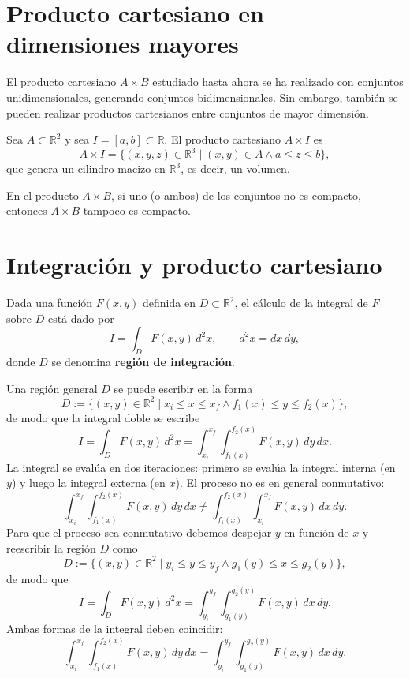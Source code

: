 \section{Producto cartesiano en dimensiones mayores}

El producto cartesiano $A\times B$ estudiado hasta ahora se ha realizado con
conjuntos unidimensionales, generando conjuntos bidimensionales. Sin
embargo, también se pueden realizar productos cartesianos entre conjuntos de
mayor dimensión.

\begin{ejemplo}
Sea $A \subset \mathbb{R}^2$ y sea $I=[a,b]\subset\mathbb{R}$. El producto
cartesiano $A \times I$ es
\[
A \times I = \{(x,y,z)\in\mathbb{R}^3 \mid (x,y)\in A \wedge a\le z\le b\},
\]
que genera un cilindro macizo en $\mathbb{R}^3$, es decir, un volumen.
\end{ejemplo}

\begin{observacion}
En el producto $A \times B$, si uno (o ambos) de los conjuntos no es
compacto, entonces $A\times B$ tampoco es compacto.
\end{observacion}

\section{Integración y producto cartesiano}

Dada una función $F(x,y)$ definida en $D \subset \mathbb{R}^2$, el cálculo de
la integral de $F$ sobre $D$ está dado por
\[
I = \int_D F(x,y)\, d^2x, \qquad d^2x = dx\,dy,
\]
donde $D$ se denomina \textbf{región de integración}.

Una región general $D$ se puede escribir en la forma
\[
D := \{(x,y)\in\mathbb{R}^2 \mid x_i \le x \le x_f \wedge f_1(x) \le y \le
f_2(x)\},
\]
de modo que la integral doble se escribe
\[
I = \int_D F(x,y)\, d^2x = \int_{x_i}^{x_f} \int_{f_1(x)}^{f_2(x)}
F(x,y)\, dy\, dx .
\]
La integral se evalúa en dos iteraciones: primero se evalúa la integral
interna (en $y$) y luego la integral externa (en $x$). El proceso no es en
general conmutativo:
\[
\int_{x_i}^{x_f}\int_{f_1(x)}^{f_2(x)} F(x,y)\,dy\,dx \neq
\int_{f_1(x)}^{f_2(x)}\int_{x_i}^{x_f} F(x,y)\,dx\,dy .
\]
Para que el proceso sea conmutativo debemos despejar $y$ en función de $x$ y
reescribir la región $D$ como
\[
D := \{(x,y)\in\mathbb{R}^2 \mid y_i\le y\le y_f \wedge g_1(y)\le x\le
g_2(y)\},
\]
de modo que
\[
I = \int_D F(x,y)\, d^2x = \int_{y_i}^{y_f}\int_{g_1(y)}^{g_2(y)} F(x,y)\,
dx\, dy .
\]
Ambas formas de la integral deben coincidir:
\[
\int_{x_i}^{x_f}\int_{f_1(x)}^{f_2(x)} F(x,y)\,dy\,dx
= \int_{y_i}^{y_f}\int_{g_1(y)}^{g_2(y)} F(x,y)\, dx\, dy .
\]

